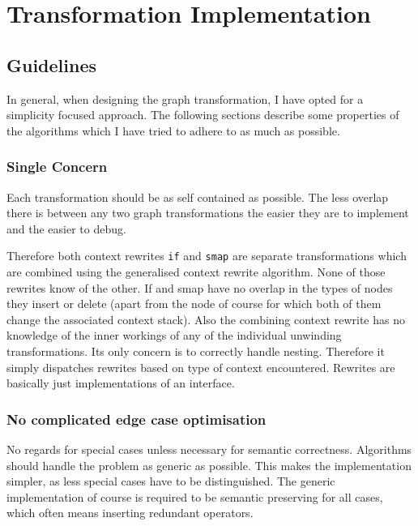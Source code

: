 \chapter{Transformation Implementation}
\label{ch:trans-implementation}


\section{Guidelines}

In general, when designing the \yauhau{} graph transformation, I have opted for a simplicity focused approach.
The following sections describe some properties of the algorithms which I have tried to adhere to as much as possible.

\subsection{Single Concern}

Each transformation should be as self contained as possible.
The less overlap there is between any two graph transformations the easier they are to implement and the easier to debug.

Therefore both context rewrites \texttt{if} and \texttt{smap} are separate transformations which are combined using the generalised context rewrite algorithm.
None of those rewrites know of the other.
If and smap have no overlap in the types of nodes they insert or delete (apart from the \fetch{} node of course for which both of them change the associated context stack).
Also the combining context rewrite has no knowledge of the inner workings of any of the individual unwinding transformations.
Its only concern is to correctly handle nesting.
Therefore it simply dispatches rewrites based on type of context encountered.
Rewrites are basically just implementations of an interface.

\subsection{No complicated edge case optimisation}

No regards for special cases unless necessary for semantic correctness.
Algorithms should handle the problem as generic as possible.
This makes the implementation simpler, as less special cases have to be distinguished.
The generic implementation of course is required to be semantic preserving for all cases, which often means inserting redundant operators.

